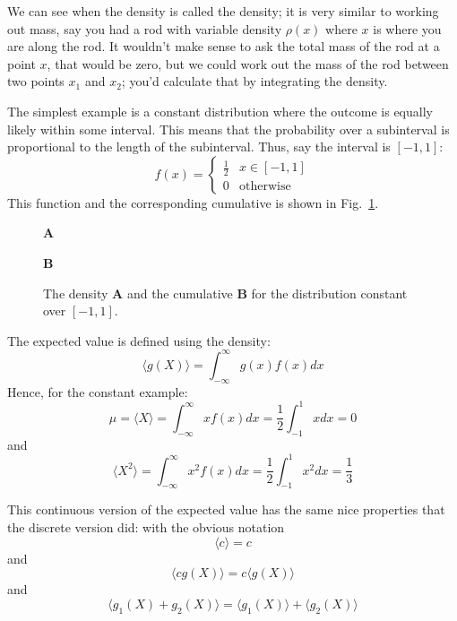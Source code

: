 \documentclass[11pt,a4paper]{scrartcl}
\begin{document}
We can see when the density is called the density; it is very similar
to working out mass, say you had a rod with variable density $\rho(x)$
where $x$ is where you are along the rod. It wouldn't make sense to
ask the total mass of the rod at a point $x$, that would be zero, but
we could work out the mass of the rod between two points $x_1$ and
$x_2$; you'd calculate that by integrating the density.

The simplest example is a constant distribution where the outcome is
equally likely within some interval. This means that the probability
over a subinterval is proportional to the length of the
subinterval. Thus, say the interval is $[-1,1]$:
\begin{equation}
f(x)=\left\{\begin{array}{ll}\frac{1}{2}&x\in [-1,1]\\0&\mbox{otherwise}\end{array}\right.
\end{equation}
This function and the corresponding cumulative is shown in Fig.~\ref{fig_const}.

\begin{figure}
\textbf{A}
\begin{center}

\end{center}
\textbf{B}
\begin{center}

\end{center}
\caption{The density \textbf{A} and the cumulative \textbf{B} for the distribution constant over $[-1,1]$.\label{fig_const}}
\end{figure}

The expected value is defined using the density:
\begin{equation}
\langle g(X)\rangle =\int_{-\infty}^\infty g(x)f(x)dx
\end{equation}
Hence, for the constant example:
\begin{equation}
\mu=\langle X\rangle=\int_{-\infty}^\infty xf(x)dx=\frac{1}{2}\int_{-1}^1xdx=0
\end{equation}
and
\begin{equation}
\langle X^2\rangle=\int_{-\infty}^\infty x^2f(x)dx=\frac{1}{2}\int_{-1}^1x^2dx=\frac{1}{3}
\end{equation}

This continuous version of the expected value has the same nice
properties that the discrete version did: with the obvious notation
\begin{equation}
\langle c\rangle=c
\end{equation}
and
\begin{equation}
\langle cg(X)\rangle =c\langle g(X)\rangle
\end{equation}
and 
\begin{equation}
\langle g_1(X)+g_2(X)\rangle =\langle g_1(X)\rangle +\langle g_2(X)\rangle
\end{equation}
\end{document}
